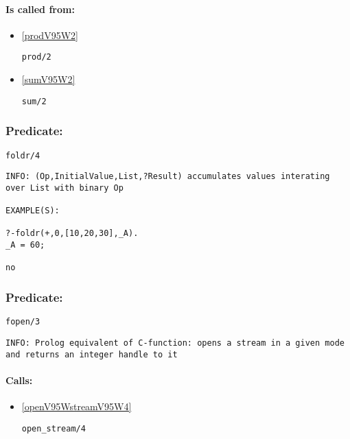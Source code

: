 \paragraph{Is called from:} 
\begin{itemize}
\item \ref{prodV95W2} 
\begin{verbatim}
prod/2
\end{verbatim}

\item \ref{sumV95W2} 
\begin{verbatim}
sum/2
\end{verbatim}

\end{itemize}

\subsubsection{Predicate:} \label{foldrV95W4}

\begin{verbatim}
foldr/4
\end{verbatim}

{\small \begin{verbatim}
INFO: (Op,InitialValue,List,?Result) accumulates values interating over List with binary Op

EXAMPLE(S):

?-foldr(+,0,[10,20,30],_A).
_A = 60;

no

\end{verbatim}}

\subsubsection{Predicate:} \label{fopenV95W3}

\begin{verbatim}
fopen/3
\end{verbatim}

{\small \begin{verbatim}
INFO: Prolog equivalent of C-function: opens a stream in a given mode and returns an integer handle to it

\end{verbatim}}
\paragraph{Calls:} 
\begin{itemize}
\item \ref{openV95WstreamV95W4} 
\begin{verbatim}
open_stream/4
\end{verbatim}

\end{itemize}
